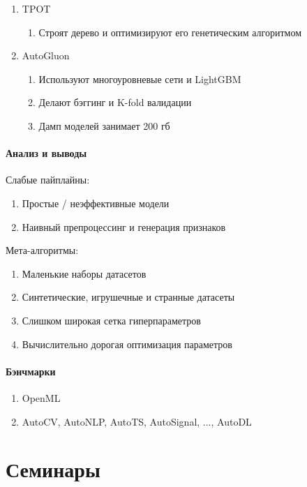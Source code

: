 \documentclass[a4paper, 12pt]{article}
\begin{document}
\begin{enumerate}
    \item TPOT
    \begin{enumerate}
        \item Строят дерево и оптимизируют его генетическим алгоритмом
    \end{enumerate}
    \item AutoGluon
    \begin{enumerate}
        \item Используют многоуровневые сети и LightGBM
        \item Делают бэггинг и K-fold валидации
        \item Дамп моделей занимает 200 гб
    \end{enumerate}
\end{enumerate}

\subsection{Анализ и выводы}

Слабые пайплайны:

\begin{enumerate}
    \item Простые / неэффективные модели
    \item Наивный препроцессинг и генерация признаков 
\end{enumerate}

Мета-алгоритмы:

\begin{enumerate}
    \item Маленькие наборы датасетов
    \item Синтетические, игрушечные и странные датасеты
    \item Слишком широкая сетка гиперпараметров
    \item Вычислительно дорогая оптимизация параметров
\end{enumerate}

\subsection{Бэнчмарки}

\begin{enumerate}
    \item OpenML
    \item AutoCV, AutoNLP, AutoTS, AutoSignal, ..., AutoDL
\end{enumerate}
\pagebreak

\part{Семинары}
\end{document}
